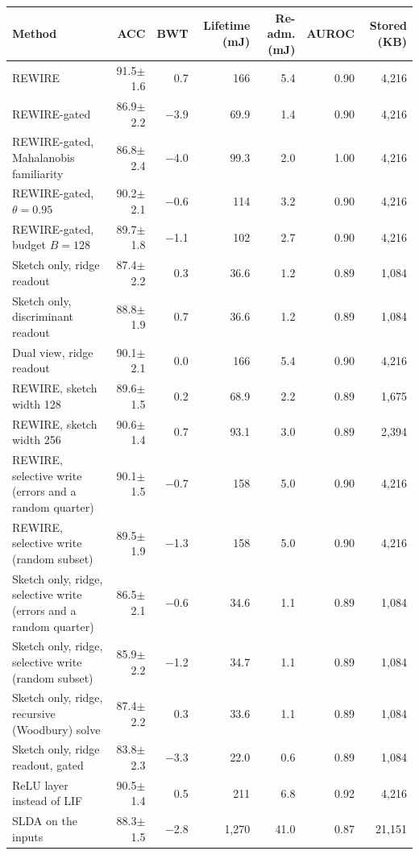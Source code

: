 \begin{tabular*}{\textwidth}{@{\extracolsep{\fill}}lrrrrrr@{}}
\toprule
Method & ACC & BWT & Lifetime (mJ) & Re-adm. (mJ) & AUROC & Stored (KB) \\
\midrule
REWIRE & 91.5$\pm$1.6 & 0.7 & 166 & 5.4 & 0.90 & 4,216 \\
REWIRE-gated & 86.9$\pm$2.2 & \ensuremath{-}3.9 & 69.9 & 1.4 & 0.90 & 4,216 \\
REWIRE-gated, Mahalanobis familiarity & 86.8$\pm$2.4 & \ensuremath{-}4.0 & 99.3 & 2.0 & 1.00 & 4,216 \\
REWIRE-gated, $\theta=0.95$ & 90.2$\pm$2.1 & \ensuremath{-}0.6 & 114 & 3.2 & 0.90 & 4,216 \\
REWIRE-gated, budget $B=128$ & 89.7$\pm$1.8 & \ensuremath{-}1.1 & 102 & 2.7 & 0.90 & 4,216 \\
Sketch only, ridge readout & 87.4$\pm$2.2 & 0.3 & 36.6 & 1.2 & 0.89 & 1,084 \\
Sketch only, discriminant readout & 88.8$\pm$1.9 & 0.7 & 36.6 & 1.2 & 0.89 & 1,084 \\
Dual view, ridge readout & 90.1$\pm$2.1 & 0.0 & 166 & 5.4 & 0.90 & 4,216 \\
REWIRE, sketch width 128 & 89.6$\pm$1.5 & 0.2 & 68.9 & 2.2 & 0.89 & 1,675 \\
REWIRE, sketch width 256 & 90.6$\pm$1.4 & 0.7 & 93.1 & 3.0 & 0.89 & 2,394 \\
REWIRE, selective write (errors and a random quarter) & 90.1$\pm$1.5 & \ensuremath{-}0.7 & 158 & 5.0 & 0.90 & 4,216 \\
REWIRE, selective write (random subset) & 89.5$\pm$1.9 & \ensuremath{-}1.3 & 158 & 5.0 & 0.90 & 4,216 \\
Sketch only, ridge, selective write (errors and a random quarter) & 86.5$\pm$2.1 & \ensuremath{-}0.6 & 34.6 & 1.1 & 0.89 & 1,084 \\
Sketch only, ridge, selective write (random subset) & 85.9$\pm$2.2 & \ensuremath{-}1.2 & 34.7 & 1.1 & 0.89 & 1,084 \\
Sketch only, ridge, recursive (Woodbury) solve & 87.4$\pm$2.2 & 0.3 & 33.6 & 1.1 & 0.89 & 1,084 \\
Sketch only, ridge readout, gated & 83.8$\pm$2.3 & \ensuremath{-}3.3 & 22.0 & 0.6 & 0.89 & 1,084 \\
ReLU layer instead of LIF & 90.5$\pm$1.4 & 0.5 & 211 & 6.8 & 0.92 & 4,216 \\
SLDA on the inputs & 88.3$\pm$1.5 & \ensuremath{-}2.8 & 1,270 & 41.0 & 0.87 & 21,151 \\

\end{tabular*}
